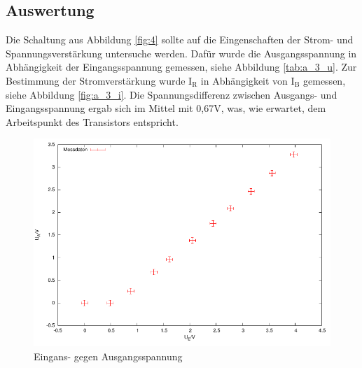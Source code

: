 \documentclass[12pt,a4paper]{article}
\begin{document}
\subsection{Auswertung}

Die Schaltung aus Abbildung \ref{fig:4} sollte auf die Eingenschaften der Strom- und Spannungsverstärkung untersuche werden. Dafür wurde die Ausgangsspannung in Abhängigkeit der Eingangsspannung gemessen, siehe Abbildung \ref{tab:a_3_u}. Zur Bestimmung der Stromverstärkung wurde I$_\text{R}$ in Abhängigkeit von I$_\text{B}$ gemessen, siehe Abbildung \ref{fig:a_3_i}.
Die Spannungsdifferenz zwischen Ausgangs- und Eingangsspannung ergab sich im Mittel mit 0,67V, was, wie erwartet, dem Arbeitspunkt des Transistors entspricht.

\begin{figure}[H] 
  \centering
    \includegraphics[scale = 0.7]{a_3_u.pdf}
  	\caption[Eingans- gegen Ausgangsspannung]{Eingans- gegen Ausgangsspannung}
  \label{fig:a_3_u}
\end{figure}
\end{document}
